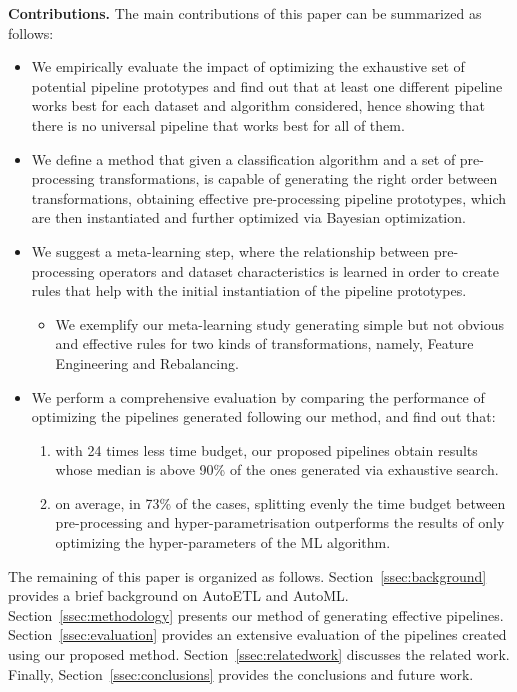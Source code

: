 \noindent\textbf{Contributions.} The main contributions of this paper can be summarized as follows:
\begin{itemize}
    \item We empirically evaluate the impact of optimizing the exhaustive set of potential pipeline prototypes and find out that at least one different pipeline works best for each dataset and algorithm considered, hence showing that there is no universal pipeline that works best for all of them.
    \item We define a method that given a classification algorithm and a set of pre-processing transformations, is capable of generating the right order between transformations, obtaining effective pre-processing pipeline prototypes, which are then instantiated and further optimized via Bayesian optimization.
    \item We suggest a meta-learning step, where the relationship between pre-processing operators and dataset characteristics is learned in order to create rules that help with the initial instantiation of the pipeline prototypes.
    \begin{itemize}
         \item We exemplify our meta-learning study generating simple but not obvious and effective rules for two kinds of transformations, namely, Feature Engineering and Rebalancing.
    \end{itemize}
    \item We perform a comprehensive evaluation by comparing the performance of optimizing the pipelines generated following our method, and find out that: 
    \begin{enumerate}
        \item with 24 times less time budget, our proposed pipelines obtain results whose median is above 90\% of the ones generated via exhaustive search.
        \item on average, in 73\% of the cases, splitting evenly the time budget between pre-processing and hyper-parametrisation outperforms the results of only optimizing the hyper-parameters of the ML algorithm.
    \end{enumerate}
\end{itemize}

The remaining of this paper is organized as follows. Section~\ref{ssec:background} provides a brief background on AutoETL and AutoML.  Section~\ref{ssec:methodology} presents our method of generating effective pipelines. 
Section~\ref{ssec:evaluation} provides an extensive evaluation of the pipelines created using our proposed method. Section~\ref{ssec:relatedwork} discusses the related work. Finally, Section~\ref{ssec:conclusions} provides the conclusions and future work.

